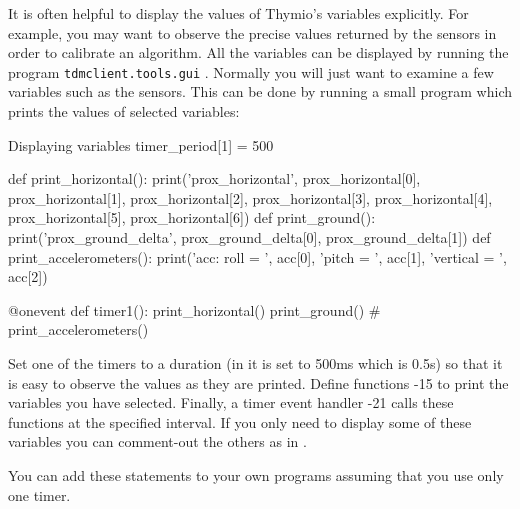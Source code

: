 \documentclass[11pt,a4paper]{article}
\newcommand*{\li}[1]{{\footnotesize\textsf{\ddag #1}}}
\begin{document}
It is often helpful to display the values of Thymio's variables explicitly. For example, you may want to observe the precise values returned by the sensors in order to calibrate an algorithm. All the variables can be displayed by running the program \texttt{tdmclient.tools.gui} \cite{tdm}. Normally you will just want to examine a few variables such as the sensors. This can be done by running a small program which prints the values of selected variables:
\begin{progln}{Displaying variables}
timer_period[1] = 500

def print_horizontal():
    print('prox_horizontal',
          prox_horizontal[0], prox_horizontal[1],
          prox_horizontal[2], prox_horizontal[3],
          prox_horizontal[4],
          prox_horizontal[5], prox_horizontal[6])
def print_ground():
    print('prox_ground_delta',
          prox_ground_delta[0], prox_ground_delta[1])
def print_accelerometers():
    print('acc: roll = ', acc[0],
          'pitch = ', acc[1],
          'vertical = ', acc[2])

@onevent
def timer1():
    print_horizontal()
    print_ground()
    # print_accelerometers()
\end{progln}

Set one of the timers to a duration (in \li{1} it is set to 500ms which is 0.5s) so that it is easy to observe the values as they are printed. Define functions \li{3-15} to print the variables you have selected. Finally, a timer event handler \li{17-21} calls these functions at the specified interval. If you only need to display some of these variables you can comment-out the others as in \li{21}.

You can add these statements to your own programs assuming that you use only one timer.



\begin{small}

\end{small}
\end{document}
